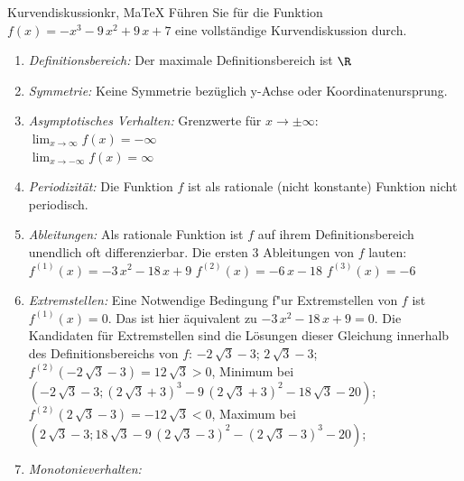  \providecommand{\MoIl}{(} 
 \providecommand{\MoIr}{)}
 \providecommand{\MIntvlSep}{;} 
 \providecommand{\MElSetSep}{;} 
 \begin{MAufgabe}{Kurvendiskussion}{kr, MaTeX}
 F\"uhren Sie f\"ur die Funktion $f(x)= - x^3 - 9\, x^2 + 9\, x + 7$ eine vollst\"andige Kurvendiskussion durch.\\ 
 \ifLsg\Loesung
 \begin{enumerate}
 \item \emph{Definitionsbereich:} 
 Der maximale Definitionsbereich ist $\R$\item \emph{Symmetrie:} 
 Keine Symmetrie bez\"uglich y-Achse oder Koordinatenursprung.\item \emph{Asymptotisches Verhalten:} 
 Grenzwerte f\"ur $x\rightarrow \pm \infty$: \\ 
 $\lim_{x\rightarrow \infty} f(x)=- \infty$ \\ 
 $\lim_{x\rightarrow -\infty} f(x)=\infty$ \\ 
 \item \emph{Periodizit\"at:} 
 Die Funktion $f$ ist als rationale (nicht konstante) Funktion nicht periodisch.\item \emph{Ableitungen:} 
 Als rationale Funktion ist $f$ auf ihrem Definitionsbereich unendlich oft differenzierbar. 
 Die ersten 3 Ableitungen von $f$ lauten: \\ 
 $f^{(1)}(x)= - 3\, x^2 - 18\, x + 9$\newline 
  $f^{(2)}(x)= - 6\, x - 18$\newline 
  $f^{(3)}(x)=-6$\newline 
  \item \emph{Extremstellen:} 
 Eine Notwendige Bedingung f"ur Extremstellen von $f$ ist $f^{(1)}(x)=0$. 
 Das ist hier \"aquivalent zu $ - 3\, x^2 - 18\, x + 9=0$. 
 Die Kandidaten f\"ur Extremstellen sind die L\"osungen dieser Gleichung innerhalb des Definitionsbereichs von $f$: $ - 2\, \sqrt{3} - 3$; $2\, \sqrt{3} - 3$; \\ 
 $f^{(2)}( - 2\, \sqrt{3} - 3)=12\, \sqrt{3}$$>0$, Minimum bei $( - 2\, \sqrt{3} - 3;{\left(2\, \sqrt{3} + 3\right)}^3 - 9\, {\left(2\, \sqrt{3} + 3\right)}^2 - 18\, \sqrt{3} - 20)$; \\ 
 $f^{(2)}(2\, \sqrt{3} - 3)=- 12\, \sqrt{3}$$<0$, Maximum bei $(2\, \sqrt{3} - 3;18\, \sqrt{3} - 9\, {\left(2\, \sqrt{3} - 3\right)}^2 - {\left(2\, \sqrt{3} - 3\right)}^3 - 20)$; \\ 
 \item \emph{Monotonieverhalten:} 

\end{enumerate}
\end{MAufgabe}
